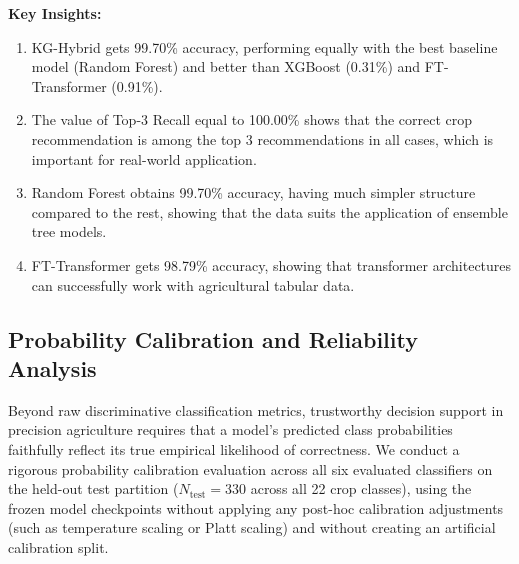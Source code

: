 \documentclass[journal]{IEEEtran}
\begin{document}
\textbf{Key Insights:}

\begin{enumerate}
    \item KG-Hybrid gets 99.70\% accuracy, performing equally with the best baseline model (Random Forest) and better than XGBoost (0.31\%) and FT-Transformer (0.91\%).
    \item The value of Top-3 Recall equal to 100.00\% shows that the correct crop recommendation is among the top 3 recommendations in all cases, which is important for real-world application.
    \item Random Forest obtains 99.70\% accuracy, having much simpler structure compared to the rest, showing that the data suits the application of ensemble tree models.
    \item FT-Transformer gets 98.79\% accuracy, showing that transformer architectures can successfully work with agricultural tabular data.
\end{enumerate}

\subsection{Probability Calibration and Reliability Analysis}

Beyond raw discriminative classification metrics, trustworthy decision support in precision agriculture requires that a model's predicted class probabilities faithfully reflect its true empirical likelihood of correctness. We conduct a rigorous probability calibration evaluation across all six evaluated classifiers on the held-out test partition ($N_{\text{test}} = 330$ across all 22 crop classes), using the frozen model checkpoints without applying any post-hoc calibration adjustments (such as temperature scaling or Platt scaling) and without creating an artificial calibration split.
\end{document}
